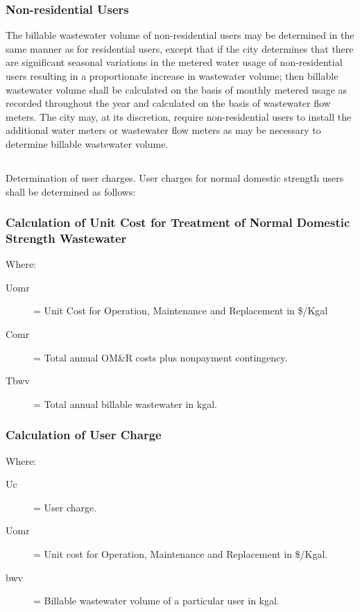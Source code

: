 \documentclass[code.tex]{subfiles}
\begin{document}
\subsubsection{Non-residential Users}
The billable wastewater volume of non-residential users may be determined in the same manner as for residential users, except that if the city determines that there are significant seasonal variations in the metered water usage of non-residential users resulting in a proportionate increase in wastewater volume; then billable wastewater volume shall be calculated on the basis of monthly metered usage as recorded throughout the year and calculated on the basis of wastewater flow meters.  The city may, at its discretion, require non-residential users to install the additional water meters or wastewater flow meters as may be necessary to determine billable wastewater volume.
\subsection{}
Determination of user charges.  User charges for normal domestic strength users shall be determined as follows:
\subsubsection{Calculation of Unit Cost for Treatment of Normal Domestic Strength Wastewater}
Where:
\begin{description}
\item[Uomr] = Unit Cost for Operation, Maintenance and Replacement in \$/Kgal
\item[Comr] = Total annual OM\&R costs plus nonpayment contingency.
\item[Tbwv] = Total annual billable wastewater in kgal.
\end{description}
\subsubsection{Calculation of User Charge}
Where:
\begin{description}
\item[Uc] = User charge.
\item[Uomr] = Unit cost for Operation, Maintenance and Replacement in \$/Kgal.
\item[bwv] = Billable wastewater volume of a particular user in kgal.
\end{description}
\end{document}
